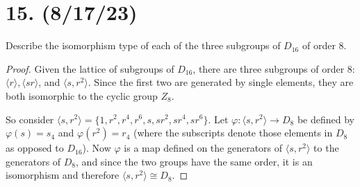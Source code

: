 \documentclass{article}
\begin{document}
\section*{15. (8/17/23)}

Describe the isomorphism type of each of the three subgroups of $D_{16}$ of order 8.

\begin{proof}
    Given the lattice of subgroups of $D_{16}$, there are three subgroups of order 8: $\langle r \rangle, \langle sr \rangle$, and $\langle s, r^2 \rangle$. Since the first two are generated by single elements, they are both isomorphic to the cyclic group $Z_8$.

    So consider $\langle s, r^2 \rangle = \{ 1, r^2, r^4, r^6, s, sr^2, sr^4, sr^6 \}$. Let $\varphi: \langle s, r^2 \rangle \rightarrow D_8$ be defined by $\varphi(s) = s_4$ and $\varphi(r^2) = r_4$ (where the subscripts denote those elements in $D_8$ as opposed to $D_{16}$). Now $\varphi$ is a map defined on the generators of $\langle s, r^2 \rangle$ to the generators of $D_8$, and since the two groups have the same order, it is an isomorphism and therefore $\langle s, r^2 \rangle \cong D_8$.
\end{proof}
\end{document}
